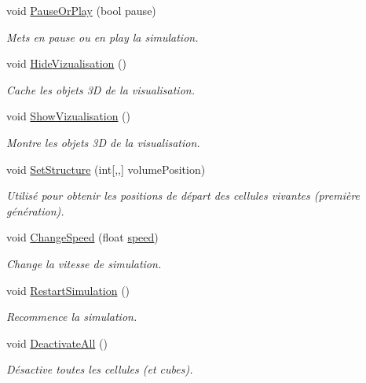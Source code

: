 \begin{DoxyCompactItemize}
void \mbox{\hyperlink{class_simulation2_a2df629e8c95d93ca5955df4b3369f16f}{Pause\+Or\+Play}} (bool pause)
\begin{DoxyCompactList}\small\item\em Mets en pause ou en play la simulation. \end{DoxyCompactList}\item 
void \mbox{\hyperlink{class_simulation2_ac1bb1640dae3927d80ec43c8f7707759}{Hide\+Vizualisation}} ()
\begin{DoxyCompactList}\small\item\em Cache les objets 3D de la visualisation. \end{DoxyCompactList}\item 
void \mbox{\hyperlink{class_simulation2_a039dde8f4d11ff8998e438051166f8b2}{Show\+Vizualisation}} ()
\begin{DoxyCompactList}\small\item\em Montre les objets 3D de la visualisation. \end{DoxyCompactList}\item 
void \mbox{\hyperlink{class_simulation2_a8508ba06258751760b848e98c57ce06d}{Set\+Structure}} (int\mbox{[},,\mbox{]} volume\+Position)
\begin{DoxyCompactList}\small\item\em Utilisé pour obtenir les positions de départ des cellules vivantes (première génération). \end{DoxyCompactList}\item 
void \mbox{\hyperlink{class_simulation2_ad962236b5b5316310e2db253a6ffecee}{Change\+Speed}} (float \mbox{\hyperlink{class_simulation2_ad5211ec4fe39100128b77239da0aae3f}{speed}})
\begin{DoxyCompactList}\small\item\em Change la vitesse de simulation. \end{DoxyCompactList}\item 
void \mbox{\hyperlink{class_simulation2_a151637139908a2546fcf9dd5203aa247}{Restart\+Simulation}} ()
\begin{DoxyCompactList}\small\item\em Recommence la simulation. \end{DoxyCompactList}\item 
void \mbox{\hyperlink{class_simulation2_a71a0bbd4c453b30461173f6fc5f1ea86}{Deactivate\+All}} ()
\begin{DoxyCompactList}\small\item\em Désactive toutes les cellules (et cubes). \end{DoxyCompactList}\item 

\end{DoxyCompactItemize}
